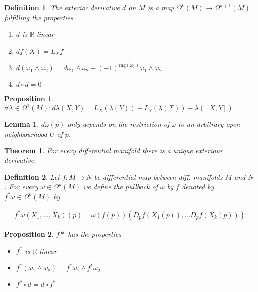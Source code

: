 \documentclass{scrartcl}
\newcommand{\R}{\mathbb R}
\newtheorem*{mydef}{Definition}
\newtheorem*{lemma}{Lemma}
\newtheorem*{prop}{Proposition}
\newtheorem*{thm}{Theorem}
\begin{document}
\begin{mydef}
  The \emph{exterior derivative} $d$ on $M$ is a map $\Omega^k(M) \rightarrow \Omega^{k+1}(M)$ fulfilling the properties

  \begin{enumerate}
  \item $d$ is $\R$-linear
  \item $df(X) = L_X f$
  \item $d(\omega_1 \wedge \omega_2) = d\omega_1 \wedge \omega_2 + (-1)^{\mathrm{rng}(\omega_1)} \omega_1 \wedge \omega_2$
  \item $d\circ d = 0$
  \end{enumerate}
\end{mydef}

\begin{prop}
  $\forall \lambda \in \Omega^1(M): d\lambda(X,Y) = L_X(\lambda(Y))-L_Y(\lambda(X))-\lambda([X,Y])$
\end{prop}

\begin{lemma}
  $d\omega(p)$ only depends on the restriction of $\omega$ to an arbitrary open neighbourhood $U$ of $p$.
\end{lemma}

\begin{thm}
  For every differential manifold there is a unique exteriour derivative.
\end{thm}

\begin{mydef}
  Let $f:M\rightarrow N$ be differential map between diff. manifolds $M$ and $N$. For every $\omega\in \Omega^k(M)$ we define the pullback of $\omega$ by $f$ denoted by $f^* \omega\in \Omega^k(M)$ by

  \begin{align}
    f^*\omega (X_1,\ldots,X_k)(p) = \omega(f(p))(D_pf(X_1(p)),\ldots D_pf(X_k(p)))
  \end{align}
\end{mydef}

\begin{prop}
  $f*$ has the properties

  \begin{itemize}
  \item $f^*$ is $\R$-linear
  \item $f^*(\omega_1 \wedge \omega_2) = f^*\omega_1 \wedge f^*\omega_2$
  \item $f^* \circ d = d \circ f^*$
  \end{itemize}
\end{prop}
\end{document}
